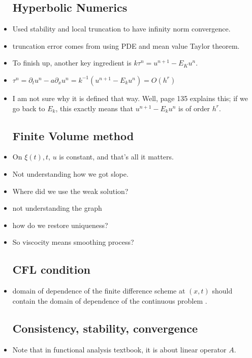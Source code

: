\documentclass{article}
\theoremstyle{remark}
\begin{document}
\begin{itemize}
\subsection*{Hyperbolic Numerics}
\item Used stability and local truncation to have infinity norm convergence.
\item truncation error comes from using PDE and mean value Taylor theorem.
\item To finish up, another key ingredient is $k\tau^n=u^{n+1}-E_K u^n$.
\item $\tau^n=\partial_t u^n-a\partial_xu^n=k^{-1}(u^{n+1}-E_k u^n)=O(h^r)$


\item I am not sure why it is defined that way. Well, page 135 explains this; if we go back to $E_k$, this exactly means that $u^{n+1}-E_k u^n$ is of order $h^r$.









\subsection*{Finite Volume method}
\item On $\xi(t),t$, $u$ is constant, and that's all it matters.
\item Not understanding how we got slope.
\item Where did we use the weak solution?
\item not understanding the graph
\item how do we restore uniqueness?
\item So viscocity means smoothing process?





\subsection*{CFL condition}
\item domain of dependence of the finite difference scheme at $(x,t)$ should contain the domain of dependence of the continuous problem .


\subsection*{Consistency, stability, convergence}
\item Note that in functional analysis textbook, it is about linear operator $A$.





\end{itemize}
\end{document}
